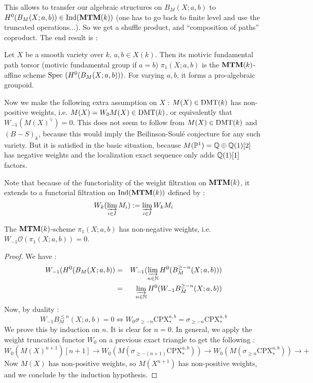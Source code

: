 This allows to transfer our algebraic structures on $B_M(X;a,b)$ to $H^0(B_M(X;a,b))\in \mathrm{Ind}(\mathbf{MTM}(k))$ (one has to go back to finite level and use the truncated operations...). So we get a shuffle product, and ``composition of paths'' coproduct. The end result is :

\begin{defn}
Let $X$ be a smooth variety over $k$, $a,b\in X(k)$. Then its motivic fundamental path torsor (motivic fundamental group if $a=b$) $\pi_1(X;a,b)$ is the $\mathbf{MTM}(k)$-affine scheme $\mathrm{Spec}~ (H^0(B_M(X;a,b)))$. For varying $a,b$, it forms a pro-algebraic groupoid.
\end{defn}

Now we make the following extra assumption on $X$ : $M(X)\in \mathrm{DMT}(k)$ has non-positive weights, i.e. $M(X)=W_0M(X)\in \mathrm{DMT}(k)$, or equivalently that $W_{-1}(M(X)^{\vee})=0$. This does not seem to follow from $M(X)\in \mathrm{DMT}(k)$ and $(B-S)_k$, because this would imply the Beilinson-Soul\'e conjecture for any such variety. But it is satisfied in the basic situation, because $M(\mathbb{P}^1)=\mathbb{Q}\oplus \mathbb{Q}(1)[2]$ has negative weights and the localization exact sequence only adds $\mathbb{Q}(1)[1]$ factors.

Note that because of the functoriality of the weight filtration on $\mathbf{MTM}(k)$, it extends to a functorial filtration on $\mathrm{Ind}(\mathbf{MTM}(k))$ defined by :
\[
W_k(\varinjlim_{i\in I}M_i):=\varinjlim_{i\in I} W_kM_i
\]

\begin{prop}
The $\mathbf{MTM}(k)$-scheme $\pi_1(X;a,b)$ has non-negative weights, i.e. $W_{-1}\mathcal{O}(\pi_1(X;a,b))=0$.
\end{prop}
\begin{proof}
We have :
\begin{eqnarray*}
W_{-1}(H^0(B_M(X;a,b)) & = & W_{-1}(\varinjlim_{n\in\mathbb{N}}H^0(B^{\geq -n}_M(X;a,b)))\\
& = & \varinjlim_{n\in\mathbb{N}} H^0(W_{-1}B^{\geq -n}_M(X;a,b))\\
\end{eqnarray*}
Now, by duality :
\[
W_{-1}B^{\leq n}_M(X;a,b) = 0\Leftrightarrow W_0\sigma_{\geq -n}\mathrm{CPX}^{a,b}_*=\sigma_{\geq -n}\mathrm{CPX}^{a,b}_*
\]
We prove this by induction on $n$. It is clear for $n=0$. In general, we apply the weight truncation functor $W_0$ on a previous exact triangle to get the following :
\[
W_0(M(X)^{n+1})[n+1]\rightarrow W_0(M(\sigma_{\geq -(n+1)}\mathrm{CPX}^{a,b}_*))\rightarrow W_0(M(\sigma_{\geq n}\mathrm{CPX}^{a,b}_*))\rightarrow +
\]
Now $M(X)$ has non-positive weights, so $M(X^{n+1})$ has non-positive weights, and we conclude by the induction hypothesis.
\end{proof}

